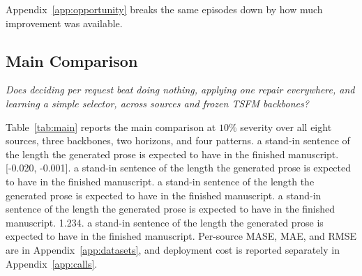 \documentclass{article}
\newcommand{\tsfm}{TSFM}
\begin{document}
Appendix~\ref{app:opportunity} breaks the same episodes down by how much improvement was
available.

\subsection{Main Comparison}
\label{sec:exp-main}
\emph{Does deciding per request beat doing nothing, applying one repair everywhere, and
learning a simple selector, across sources and frozen \tsfm{} backbones?}

Table~\ref{tab:main} reports the main comparison at $10\%$ severity over all eight sources,
three backbones, two horizons, and four patterns. a stand-in sentence of the length the generated prose is expected to have in the finished manuscript.
[-0.020, -0.001]. a stand-in sentence of the length the generated prose is expected to have in the finished manuscript. a stand-in sentence of the length the generated prose is expected to have in the finished manuscript. a stand-in sentence of the length the generated prose is expected to have in the finished manuscript.
1.234. a stand-in sentence of the length the generated prose is expected to have in the finished manuscript.
Per-source MASE, MAE, and RMSE are in Appendix~\ref{app:datasets}, and
deployment cost is reported separately in Appendix~\ref{app:calls}.
\end{document}
